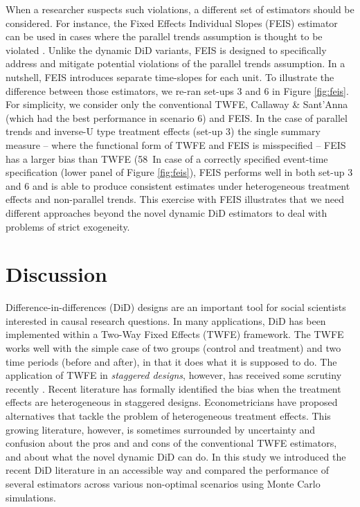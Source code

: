 When a researcher suspects such violations, a different set of estimators should be considered. For instance, the Fixed Effects Individual Slopes (FEIS) estimator can be used in cases where the parallel trends assumption is thought to be violated \cite{Polachek.1994, Ruttenauer.2023}. Unlike the dynamic DiD variants, FEIS is designed to specifically address and mitigate potential violations of the parallel trends assumption. In a nutshell, FEIS introduces separate time-slopes for each unit. To illustrate the difference between those estimators, we re-ran set-ups 3 and 6 in Figure \ref{fig:feis}. For simplicity, we consider only the conventional TWFE, Callaway \& Sant'Anna (which had the best performance in scenario 6) and FEIS. In the case of parallel trends and inverse-U type treatment effects (set-up 3) the single summary measure -- where the functional form of TWFE and FEIS is misspecified -- FEIS has a larger bias than TWFE (58\
In case of a correctly specified event-time specification (lower panel of Figure \ref{fig:feis}), FEIS performs well in both set-up 3 and 6 and is able to produce consistent estimates under heterogeneous treatment effects and non-parallel trends. This exercise with FEIS illustrates that we need different approaches beyond the novel dynamic DiD estimators to deal with problems of strict exogeneity.


\section{Discussion}

Difference-in-differences (DiD) designs are an important tool for social scientists interested in causal research questions. In many applications, DiD has  been implemented within a Two-Way Fixed Effects (TWFE) framework. 
The TWFE works well with the simple case of two groups (control and treatment) and two time periods (before and after), in that it does what it is supposed to do. The application of TWFE in \emph{staggered designs}, however, has received some scrutiny recently \cite{Goodman-Bacon.2021, Wooldridge.2021}. Recent literature has formally identified the bias when the treatment effects are heterogeneous in staggered designs. Econometricians have proposed alternatives that tackle the problem of heterogeneous treatment effects. This growing literature, however, is sometimes surrounded by uncertainty and confusion about the pros and and cons of the conventional TWFE estimators, and about what the novel dynamic DiD can do. In this study we introduced the recent DiD literature in an accessible way and compared the performance of several estimators across various non-optimal scenarios using Monte Carlo simulations. 

